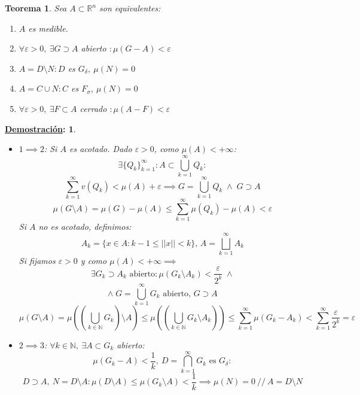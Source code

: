 \documentclass[10pt,a4paper,openright]{book}
\theoremstyle{break}
\newtheorem*{theo}{Teorema}
\newtheorem*{demo}{\underline{Demostración}:}
\begin{document}
\begin{theo}
Sea $A \subset \mathbb{R}^n$ son equivalentes:  
\begin{enumerate}
\item $A$ es medible.
\item $\forall \varepsilon > 0,\ \exists G \supset A$ abierto $: \mu\left( G - A  \right) < \varepsilon$  
\item $A = D \setminus N: D$ es $G_{\delta},\ \mu\left( N \right) = 0$  
\item $A = C \cup N: C$ es $F_{\sigma},\ \mu\left( N \right) = 0$  
\item $\forall \varepsilon > 0,\ \exists F \subset A$ cerrado $: \mu\left( A - F \right) < \varepsilon$  
\end{enumerate}
\end{theo}
\begin{demo}
\begin{itemize}
\item $1 \implies 2$: Si $A$ es acotado. Dado $\varepsilon > 0$, como $\mu\left( A \right) < +\infty$:
$$\exists \{Q_k\}_{k=1}^{\infty} : A \subset \bigcup_{k=1}^\infty Q_k :$$  
$$\sum_{k=1}^{\infty} v\left( Q_k \right) < \mu\left( A \right) + \varepsilon \implies G = \bigcup_{k=1}^{\infty} Q_k\; \land \; G\supset A$$ 
$$\mu\left( G \setminus A \right) = \mu\left( G \right) - \mu\left( A \right) \le \sum_{k=1}^{\infty} \mu\left( Q_k \right) - \mu\left( A \right) < \varepsilon $$ 
Si $A$ no es acotado, definimos: 
$$A_k = \{x \in A: k - 1 \le \vert \vert x \vert  \vert < k \} \text{, } A = \bigsqcup_{k=1}^{\infty}A_k$$ 
Si fijamos $\varepsilon > 0$ y como $\mu\left( A \right) < +\infty \implies$
$$\exists G_k \supset A_k \text{ abierto} : \mu\left( G_k \setminus A_k \right) < \frac{\varepsilon}{2^k}\; \land$$ 
$$\land \;G = \bigcup_{k=1}^{\infty}G_k \text{ abierto, } G \supset A$$ 
$$\mu\left( G \setminus A \right) = \mu\left( \left( \bigcup_{k \in \mathbb{N}}G_k  \right) \setminus A   \right) \le \mu\left( \left( \bigcup_{k \in \mathbb{N}} G_k \setminus A_k  \right)  \right) \le \sum_{k=1}^{\infty} \mu\left( G_k - A_k \right) < \sum_{k=1}^{\infty} \frac{\varepsilon}{2^k} = \varepsilon $$ 

\item $2 \implies 3$: $\forall k \in \mathbb{N},\ \exists A \subset G_k$ abierto: 
$$\mu\left( G_k - A \right) < \frac{1}{k},\ D = \bigcap_{k=1}^{\infty}G_k \text{ es } G_{\delta}:$$ 
$$D \supset A,\ N = D \setminus A: \mu\left( D \setminus A \right) \le \mu\left( G_k \setminus A \right) < \frac{1}{k} \implies \mu\left( N \right) = 0\ //\ A = D \setminus N$$ 


\end{itemize}
\end{demo}
\end{document}
